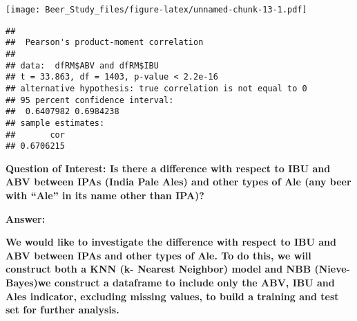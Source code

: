 \documentclass[
]{article}
\newenvironment{Shaded}{\begin{snugshade}}{\end{snugshade}}
\newcommand{\CommentTok}[1]{\textcolor[rgb]{0.56,0.35,0.01}{\textit{#1}}}
\newcommand{\DataTypeTok}[1]{\textcolor[rgb]{0.13,0.29,0.53}{#1}}
\newcommand{\DecValTok}[1]{\textcolor[rgb]{0.00,0.00,0.81}{#1}}
\newcommand{\FloatTok}[1]{\textcolor[rgb]{0.00,0.00,0.81}{#1}}
\newcommand{\KeywordTok}[1]{\textcolor[rgb]{0.13,0.29,0.53}{\textbf{#1}}}
\newcommand{\NormalTok}[1]{#1}
\newcommand{\OperatorTok}[1]{\textcolor[rgb]{0.81,0.36,0.00}{\textbf{#1}}}
\newcommand{\StringTok}[1]{\textcolor[rgb]{0.31,0.60,0.02}{#1}}
\begin{document}
\texttt{[image: Beer\_Study\_files/figure-latex/unnamed-chunk-13-1.pdf]}

\begin{Shaded}
\end{Shaded}

\begin{verbatim}
## 
##  Pearson's product-moment correlation
## 
## data:  dfRM$ABV and dfRM$IBU
## t = 33.863, df = 1403, p-value < 2.2e-16
## alternative hypothesis: true correlation is not equal to 0
## 95 percent confidence interval:
##  0.6407982 0.6984238
## sample estimates:
##       cor 
## 0.6706215
\end{verbatim}

\textbf{Question of Interest: Is there a difference with respect to IBU
and ABV between IPAs (India Pale Ales) and other types of Ale (any beer
with ``Ale'' in its name other than IPA)?}

\textbf{Answer:}

\textbf{We would like to investigate the difference with respect to IBU
and ABV between IPAs and other types of Ale. To do this, we will
construct both a KNN (k- Nearest Neighbor) model and NBB (Nieve-Bayes)we
construct a dataframe to include only the ABV, IBU and Ales indicator,
excluding missing values, to build a training and test set for further
analysis.}

\begin{Shaded}
\end{Shaded}
\end{document}
